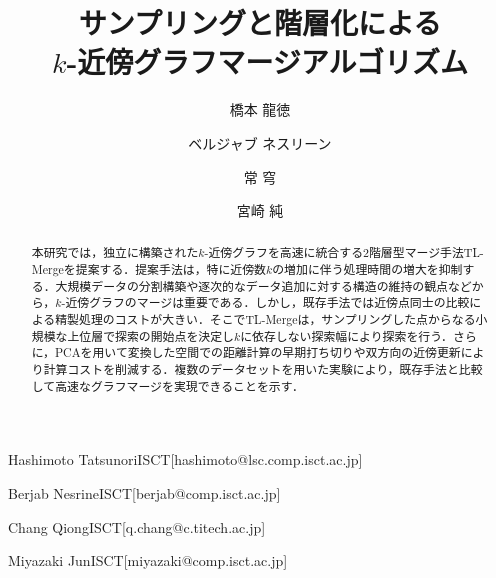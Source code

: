 \documentclass[submit,techrep,noauthor]{ipsj}
\begin{document}
\title{サンプリングと階層化による\\
$k$-近傍グラフマージアルゴリズム}




\author{橋本 龍徳}{Hashimoto Tatsunori}{ISCT}[hashimoto@lsc.comp.isct.ac.jp]
\author{ベルジャブ ネスリーン}{Berjab Nesrine}{ISCT}[berjab@comp.isct.ac.jp]
\author{常 穹}{Chang Qiong}{ISCT}[q.chang@c.titech.ac.jp]
\author{宮崎 純}{Miyazaki Jun}{ISCT}[miyazaki@comp.isct.ac.jp]

\begin{abstract}
本研究では，独立に構築された$k$-近傍グラフを高速に統合する2階層型マージ手法TL-Mergeを提案する．提案手法は，特に近傍数$k$の増加に伴う処理時間の増大を抑制する．大規模データの分割構築や逐次的なデータ追加に対する構造の維持の観点などから，$k$-近傍グラフのマージは重要である．しかし，既存手法では近傍点同士の比較による精製処理のコストが大きい．そこでTL-Mergeは，サンプリングした点からなる小規模な上位層で探索の開始点を決定し$k$に依存しない探索幅により探索を行う．さらに，PCAを用いて変換した空間での距離計算の早期打ち切りや双方向の近傍更新により計算コストを削減する．複数のデータセットを用いた実験により，既存手法と比較して高速なグラフマージを実現できることを示す．
\end{abstract}

%
%
%
\end{document}
